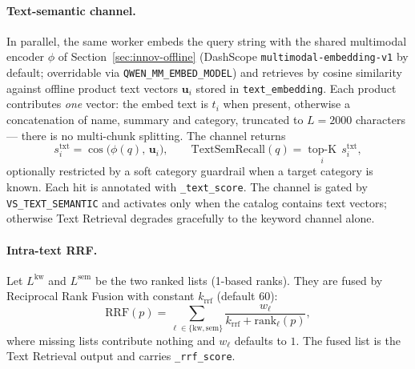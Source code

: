 \paragraph{Text-semantic channel.}
In parallel, the same worker embeds the query string with the shared multimodal
encoder $\phi$ of Section~\ref{sec:innov-offline} (DashScope
\texttt{multimodal-embedding-v1} by default; overridable via
\texttt{QWEN\_MM\_EMBED\_MODEL}) and retrieves by cosine similarity against
offline product text vectors $\mathbf{u}_i$ stored in
\texttt{text\_embedding}. Each product contributes \emph{one} vector: the embed
text is $t_i$ when present, otherwise a concatenation of name, summary and
category, truncated to $L{=}2000$ characters --- there is no multi-chunk
splitting. The channel returns
\begin{equation}
  s^{\mathrm{txt}}_i=\cos\!\big(\phi(q),\,\mathbf{u}_i\big),
  \qquad
  \mathrm{TextSemRecall}(q)=\operatorname*{top\text{-}K}_{i}\, s^{\mathrm{txt}}_i,
  \label{eq:stxt}
\end{equation}
optionally restricted by a soft category guardrail when a target category is
known. Each hit is annotated with \texttt{\_text\_score}. The channel is gated by
\texttt{VS\_TEXT\_SEMANTIC} and activates only when the catalog contains text
vectors; otherwise Text Retrieval degrades gracefully to the keyword channel
alone.

\paragraph{Intra-text RRF.}
Let $L^{\mathrm{kw}}$ and $L^{\mathrm{sem}}$ be the two ranked lists (1-based
ranks). They are fused by Reciprocal Rank Fusion with constant $k_{\mathrm{rrf}}$
(default $60$):
\begin{equation}
  \mathrm{RRF}(p)=\sum_{\ell\in\{\mathrm{kw},\mathrm{sem}\}}
  \frac{w_{\ell}}{k_{\mathrm{rrf}}+\mathrm{rank}_{\ell}(p)},
  \label{eq:rrf-text}
\end{equation}
where missing lists contribute nothing and $w_{\ell}$ defaults to $1$. The fused
list is the Text Retrieval output and carries \texttt{\_rrf\_score}.


